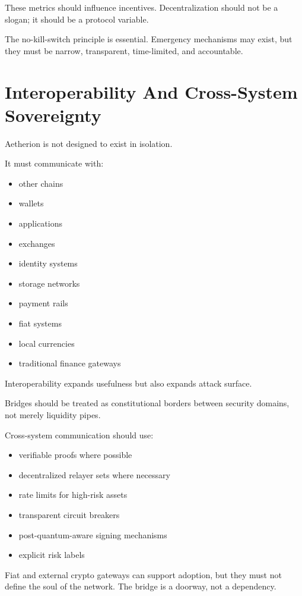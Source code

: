 ﻿\documentclass[12pt]{article}
\begin{document}
These metrics should influence incentives. Decentralization should not be a slogan; it should be a protocol variable.

The no-kill-switch principle is essential. Emergency mechanisms may exist, but they must be narrow, transparent, time-limited, and accountable.

\section{Interoperability And Cross-System Sovereignty}


Aetherion is not designed to exist in isolation.

It must communicate with:

\begin{itemize}
  \item other chains
  \item wallets
  \item applications
  \item exchanges
  \item identity systems
  \item storage networks
  \item payment rails
  \item fiat systems
  \item local currencies
  \item traditional finance gateways
\end{itemize}

Interoperability expands usefulness but also expands attack surface.

Bridges should be treated as constitutional borders between security domains, not merely liquidity pipes.

Cross-system communication should use:

\begin{itemize}
  \item verifiable proofs where possible
  \item decentralized relayer sets where necessary
  \item rate limits for high-risk assets
  \item transparent circuit breakers
  \item post-quantum-aware signing mechanisms
  \item explicit risk labels
\end{itemize}

Fiat and external crypto gateways can support adoption, but they must not define the soul of the network. The bridge is a doorway, not a dependency.
\end{document}

